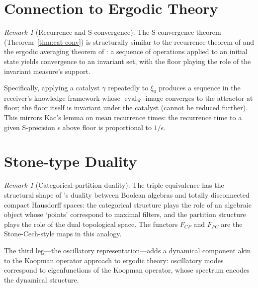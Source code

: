 \documentclass[twocolumn,11pt,a4paper]{article}
\theoremstyle{thmstyle}
\theoremstyle{thmstyle}
\theoremstyle{definition}
\theoremstyle{remark}
\newtheorem{remark}[theorem]{Remark}
\DeclareMathOperator{\eval}{eval}
\newcommand{\receiver}{\mathcal{R}}
\begin{document}
\section{Connection to Ergodic Theory}
\label{sec:ergodic-connection}

\begin{remark}[Recurrence and S-convergence]
\label{rem:recurrence-conv}
The S-convergence theorem
(Theorem~\ref{thm:cat-conv}) is structurally
similar to the recurrence theorem of
\citet{poincare1890} and the ergodic averaging
theorem of \citet{birkhoff1931}: a sequence
of operations applied to an initial state
yields convergence to an invariant set, with the
floor playing the role of the invariant measure's
support.

Specifically, applying a catalyst $\gamma$
repeatedly to $\xi_{0}$ produces a sequence in
the receiver's knowledge framework whose
$\eval_{\receiver}$-image converges to the
attractor at floor; the floor itself is invariant
under the catalyst (cannot be reduced further).
This mirrors Kac's lemma \citep{kac1947} on
mean recurrence times: the recurrence time to a
given S-precision $\epsilon$ above floor is
proportional to $1/\epsilon$.
\end{remark}

\section{Stone-type Duality}
\label{sec:stone-duality}

\begin{remark}[Categorical-partition duality]
\label{rem:cat-part-duality}
The triple equivalence has the structural shape of
\citet{stone1936}'s duality between Boolean
algebras and totally disconnected compact
Hausdorff spaces: the categorical structure plays
the role of an algebraic object whose `points'
correspond to maximal filters, and the partition
structure plays the role of the dual topological
space.  The functors $F_{CP}$ and $F_{PC}$ are
the Stone-Cech-style maps in this analogy.

The third leg---the oscillatory representation---adds
a dynamical component akin to the Koopman
operator approach \citep{koopman1931} to ergodic
theory: oscillatory modes correspond to
eigenfunctions of the Koopman operator, whose
spectrum encodes the dynamical structure.
\end{remark}



\end{document}
